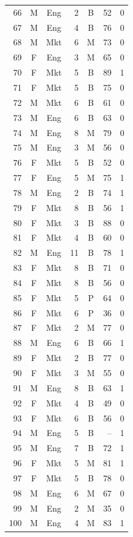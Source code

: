 \documentclass[11pt,a4paper]{article}
\begin{document}
\begin{center}
\begin{tabular}[t]{@{}r c c r c r c@{}}
66 & M & Eng & 2 & B & 52 & 0 \\
67 & M & Eng & 4 & B & 76 & 0 \\
68 & M & Mkt & 6 & M & 73 & 0 \\
69 & F & Eng & 3 & M & 65 & 0 \\
70 & F & Mkt & 5 & B & 89 & 1 \\
71 & F & Mkt & 5 & B & 75 & 0 \\
72 & M & Mkt & 6 & B & 61 & 0 \\
73 & M & Eng & 6 & B & 63 & 0 \\
74 & M & Eng & 8 & M & 79 & 0 \\
75 & M & Eng & 3 & M & 56 & 0 \\
76 & F & Mkt & 5 & B & 52 & 0 \\
77 & F & Eng & 5 & M & 75 & 1 \\
78 & M & Eng & 2 & B & 74 & 1 \\
79 & F & Mkt & 8 & B & 56 & 1 \\
80 & F & Mkt & 3 & B & 88 & 0 \\
81 & F & Mkt & 4 & B & 60 & 0 \\
82 & M & Eng & 11 & B & 78 & 1 \\
83 & F & Mkt & 8 & B & 71 & 0 \\
84 & F & Mkt & 8 & B & 56 & 0 \\
85 & F & Mkt & 5 & P & 64 & 0 \\
86 & F & Mkt & 6 & P & 36 & 0 \\
87 & F & Mkt & 2 & M & 77 & 0 \\
88 & M & Eng & 6 & B & 66 & 1 \\
89 & F & Mkt & 2 & B & 77 & 0 \\
90 & F & Mkt & 3 & M & 55 & 0 \\
91 & M & Eng & 8 & B & 63 & 1 \\
92 & F & Mkt & 4 & B & 49 & 0 \\
93 & F & Mkt & 6 & B & 56 & 0 \\
94 & M & Eng & 5 & B & -- & 1 \\
95 & M & Eng & 7 & B & 72 & 1 \\
96 & F & Mkt & 5 & M & 81 & 1 \\
97 & F & Mkt & 5 & B & 78 & 0 \\
98 & M & Eng & 6 & M & 67 & 0 \\
99 & M & Eng & 2 & M & 35 & 0 \\
100 & M & Eng & 4 & M & 83 & 1 \\
\bottomrule
\end{tabular}

\end{center}
\end{document}
